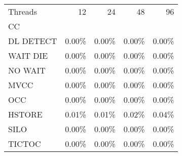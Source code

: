 \begin{tabular}{lrrrr}
\toprule
Threads &    12 &    24 &    48 &    96 \\
CC        &       &       &       &       \\
\midrule
DL DETECT & 0.00\% & 0.00\% & 0.00\% & 0.00\% \\
WAIT DIE  & 0.00\% & 0.00\% & 0.00\% & 0.00\% \\
NO WAIT   & 0.00\% & 0.00\% & 0.00\% & 0.00\% \\
MVCC      & 0.00\% & 0.00\% & 0.00\% & 0.00\% \\
OCC       & 0.00\% & 0.00\% & 0.00\% & 0.00\% \\
HSTORE    & 0.01\% & 0.01\% & 0.02\% & 0.04\% \\
SILO      & 0.00\% & 0.00\% & 0.00\% & 0.00\% \\
TICTOC    & 0.00\% & 0.00\% & 0.00\% & 0.00\% \\
\bottomrule
\end{tabular}
